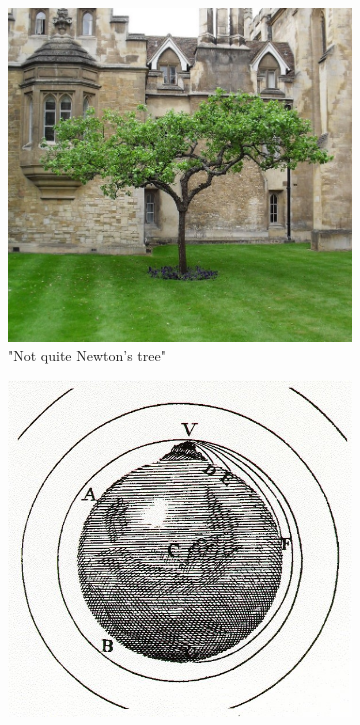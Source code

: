 \begin{figure}
\center
    \centering
    \begin{subfigure}[b]{0.35\textwidth}
    	\centering
    	\includegraphics[width=\linewidth]{Figures/0_newtontree.jpg}
        \caption{"Not quite Newton's tree"}
        \label{Fig:0_newton_1}
    \end{subfigure}
    \begin{subfigure}[b]{0.36\textwidth}
    	\centering
    	\includegraphics[width=0.9\linewidth]{Figures/0_newtoncannon.jpg}

\end{subfigure}
\end{figure}
